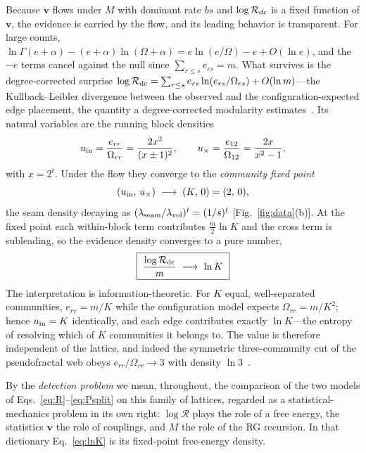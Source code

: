 \documentclass[preprint,12pt]{elsarticle}
\newcommand{\Rev}{\mathcal{R}}
\newcommand{\logR}{\log \Rev}
\newcommand{\Om}{\Omega}
\begin{document}
Because $\bm v$ flows under $M$ with dominant rate $bs$ and $\logR_{\rm dc}$ is
a fixed function of $\bm v$, the evidence is carried by the flow, and its
leading behavior is transparent. For large counts,
$\ln\Gamma(e{+}\alpha)-(e{+}\alpha)\ln(\Om{+}\alpha)=e\ln(e/\Om)-e+O(\ln e)$,
and the $-e$ terms cancel against the null since $\sum_{r\le s}e_{rs}=m$. What
survives is the degree-corrected surprise
$\logR_{\rm dc}=\sum_{r\le s}e_{rs}\ln(e_{rs}/\Om_{rs})+O(\ln m)$---the
Kullback--Leibler divergence between the observed and the
configuration-expected edge placement, the quantity a degree-corrected modularity
estimates~\cite{newman2006}. Its natural variables are the running block
densities
\begin{equation}
  u_{\rm in}=\frac{e_{rr}}{\Om_{rr}}=\frac{2x^2}{(x\pm1)^2},
  \qquad
  u_{\times}=\frac{e_{12}}{\Om_{12}}=\frac{2x}{x^2-1},
  \label{eq:densities}
\end{equation}
with $x=2^t$. Under the flow they converge to the \emph{community fixed point}
\begin{equation}
  (u_{\rm in},\,u_{\times}) \;\longrightarrow\; (K,\,0) = (2,\,0),
  \label{eq:fp}
\end{equation}
the seam density decaying as
$(\lambda_{\rm seam}/\lambda_{\rm vol})^t=(1/s)^t$
[Fig.~\ref{fig:data}(b)]. At the fixed point each within-block term contributes
$\tfrac{m}{2}\ln K$ and the cross term is subleading, so the evidence density
converges to a pure number,
\begin{equation}
  \boxed{\ \frac{\logR_{\rm dc}}{m}\ \longrightarrow\ \ln K\ }
  \label{eq:lnK}
\end{equation}
The interpretation is information-theoretic. For $K$ equal, well-separated
communities, $e_{rr}=m/K$ while the configuration model expects
$\Om_{rr}=m/K^2$; hence $u_{\rm in}=K$ identically, and each edge contributes
exactly $\ln K$---the entropy of resolving which of $K$ communities it belongs
to. The value is therefore independent of the lattice, and indeed the symmetric
three-community cut of the pseudofractal web obeys $e_{rr}/\Om_{rr}\to3$ with
density $\ln3$~\cite{vazquez2026communitystructurepseudofractalweb}.

By the \emph{detection problem} we mean, throughout, the comparison of the two models
of Eqs.~\eqref{eq:R}--\eqref{eq:Psplit} on this family of lattices, regarded as
a statistical-mechanics problem in its own right: $\logR$ plays the role of a
free energy, the statistics $\bm v$ the role of couplings, and $M$ the role of
the RG recursion. In that dictionary Eq.~\eqref{eq:lnK} is its fixed-point
free-energy density.
\end{document}
